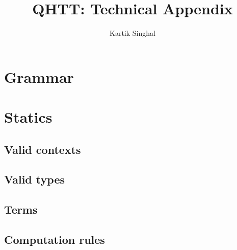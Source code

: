 \documentclass[adraft,creativecommons]{eptcs}
\title{QHTT: Technical Appendix}
\author{
Kartik Singhal
\institute{University of Chicago}
\email{\mailtodomain{ks@cs.uchicago.edu}}
}
\begin{document}
\section{Grammar}


\section{Statics}

\subsection{Valid contexts}


\subsection{Valid types}


\subsection{Terms}




\subsection{Computation rules}

\end{document}
